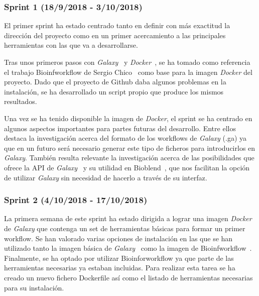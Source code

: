 \subsubsection{Sprint 1 (18/9/2018 - 3/10/2018)}
El primer sprint ha estado centrado tanto en definir con más exactitud la dirección del proyecto como en un primer acercamiento a las principales herramientas con las que va a desarrollarse. 

Tras unos primeros pasos con \textit{Galaxy}~\cite{Galaxy} y \textit{Docker}~\cite{Docker}, se ha tomado como referencia el trabajo Bioinfworkflow de Sergio Chico~\cite{Chico2018} como base para la imagen \textit{Docker} del proyecto. Dado que el proyecto de Github daba algunos problemas en la instalación, se ha desarrollado un script propio que produce los mismos resultados.

Una vez se ha tenido disponible la imagen de \textit{Docker}, el sprint se ha centrado en algunos aspectos importantes para partes futuras del desarrollo. Entre ellos destaca la investigación acerca del formato de los workflows de \textit{Galaxy} (.ga) ya que en un futuro será necesario generar este tipo de ficheros para introducirlos en \textit{Galaxy}. También resulta relevante la investigación acerca de las posibilidades que ofrece la API de \textit{Galaxy}~\cite{Galaxy} y su utilidad en Bioblend~\cite{GalaxyAPI}, que nos facilitan la opción de utilizar \textit{Galaxy} sin necesidad de hacerlo a través de su interfaz.

\subsubsection{Sprint 2 (4/10/2018 - 17/10/2018)}
La primera semana de este sprint ha estado dirigida a lograr una imagen \textit{Docker} de \textit{Galaxy} que contenga un set de herramientas básicas para formar un primer workflow. Se han valorado varias opciones de instalación en las que se han utilizado tanto la imagen básica de \textit{Galaxy}~\cite{GalaxyDocker} como la imagen de Bioinfworkflow~\cite{Chico2018}. Finalmente, se ha optado por utilizar Bioinforworkflow ya que parte de las herramientas necesarias ya estaban incluidas. 
Para realizar esta tarea se ha creado un nuevo fichero Dockerfile así como el listado de herramientas necesarias para su instalación.

